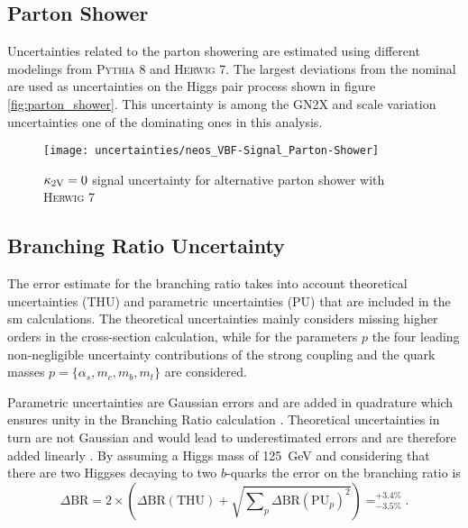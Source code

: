 \subsection{Parton Shower}
Uncertainties related to the parton showering are estimated using different modelings from \textsc{Pythia 8} and \textsc{Herwig 7}. The largest deviations from the nominal are used as uncertainties on the Higgs pair process shown in figure \ref{fig:parton_shower}. This uncertainty is among the GN2X and scale variation uncertainties one of the dominating ones in this analysis.
\begin{figure}
    \centering
    \texttt{[image: uncertainties/neos\_VBF-Signal\_Parton-Shower]}
    \caption[]{$\kappa_{\text{2V}}=0$ signal uncertainty for alternative parton shower with \textsc{Herwig 7}}
\end{figure}


\subsection{Branching Ratio Uncertainty}
The error estimate for the branching ratio takes into account theoretical uncertainties (THU) and parametric uncertainties (PU) that are included in the \ac{sm} calculations. The theoretical uncertainties mainly considers missing higher orders in the cross-section calculation, while for the parameters $p$ the four leading non-negligible uncertainty contributions of the strong coupling and the quark masses $p=\{\alpha_s,m_c,m_b,m_t\}$ are considered.

Parametric uncertainties are Gaussian errors and are added in quadrature which ensures unity in the Branching Ratio calculation \citep{de2016arxiv}. Theoretical uncertainties in turn are not Gaussian and would lead to underestimated errors and are therefore added linearly \citep{de2016arxiv}. By assuming a Higgs mass of \qty[]{125}{GeV} and considering that there are two Higgses decaying to two $b$-quarks the error on the branching ratio is
\begin{equation}
    \Delta\text{BR} = 2 \times \left(\Delta\text{BR}(\text{THU}) + \sqrt{\sum\nolimits_{p} \Delta\text{BR}(\text{PU}_{p})^2 }\right) = _{-3.5\%}^{+3.4\%}.
\end{equation}

